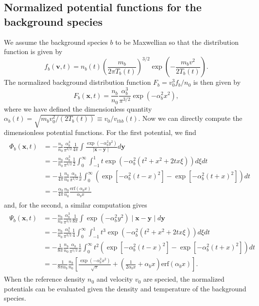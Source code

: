 \documentclass[preprint]{revtex4}
\newcommand{\erf}{\textrm{erf}}
\begin{document}
\subsection{Normalized potential functions for the background species}
We assume the background species $b$ to be Maxwellian so that the distribution function is given by
\begin{equation}
f_b(\bm{v},t)=n_b(t)\left(\frac{m_b}{2\pi T_b(t)}\right)^{3/2}\exp\left(-\frac{m_bv^2}{2T_b(t)}\right).
\end{equation}
The normalized background distribution function $F_b=v_0^3f_b/n_0$ is then given by
\begin{equation}
F_b(\bm{x},t)=\frac{n_b}{n_0}\frac{\alpha_b^3}{\pi^{3/2}}\exp\left(-\alpha_b^2x^2\right),
\end{equation}
where we have defined the dimensionless quantity $\alpha_b(t)=\sqrt{m_bv_0^2/(2 T_b(t))}\equiv v_0/v_{thb}(t)$. Now we can directly compute the dimensionless potential functions. For the first potential, we find
\begin{align}
\begin{split}
\Phi_b(\bm{x},t)&=-\frac{n_b}{n_0}\frac{\alpha_b^3}{\pi^{3/2}}\frac{1}{4\pi}\int \frac{\exp\left(-\alpha_b^2y^2\right)}{\mid \bm{x}-\bm{y}\mid}d\bm{y}\\
&=-\frac{n_b}{n_0}\frac{\alpha_b^3}{\pi^{3/2}}\frac{1}{2}\int_{0}^{\infty}\int_{-1}^{1} t\exp\left(-\alpha_b^2(t^2+x^2+2tx\xi)\right)d\xi dt\\
&=-\frac{1}{4\pi}\frac{n_b}{n_0}\frac{\alpha_b}{\pi^{1/2}}\frac{1}{x}\int_0^{\infty}\left(\exp[-\alpha_b^2(t-x)^2]-\exp[-\alpha_b^2(t+x)^2]\right)dt\\
&=-\frac{\alpha_b}{4\pi}\frac{n_b}{n_0}\frac{\erf\left(\alpha_bx\right)}{\alpha_bx}
\end{split}
\end{align}
and, for the second, a similar computation gives
\begin{align}
\begin{split}
\Psi_b(\bm{x},t)&=-\frac{n_b}{n_0}\frac{\alpha_b^3}{\pi^{3/2}}\frac{1}{8\pi}\int \exp\left(-\alpha_b^2y^2\right)\mid \bm{x}-\bm{y}\mid d\bm{y}\\
&=-\frac{n_b}{n_0}\frac{\alpha_b^3}{\pi^{3/2}}\frac{1}{4}\int_{0}^{\infty}\int_{-1}^{1} t^3\exp\left(-\alpha_b^2(t^2+x^2+2tx\xi)\right)d\xi dt\\
&=-\frac{1}{8\pi}\frac{n_b}{n_0}\frac{\alpha_b}{\pi^{1/2}}\frac{1}{x}\int_0^{\infty}t^2\left(\exp[-\alpha_b^2(t-x)^2]-\exp[-\alpha_b^2(t+x)^2]\right)dt\\
&=-\frac{1}{8\pi\alpha_b}\frac{n_b}{n_0}\left[\frac{\exp(-\alpha_b^2x^2)}{\sqrt{\pi}}+\left(\frac{1}{2\alpha_bx}+\alpha_bx\right)\erf(\alpha_bx)\right].
\end{split}
\end{align}
When the reference density $n_0$ and velocity $v_0$ are specied, the normalized potentials can be evaluated given the density and temperature of the background species.
\end{document}

